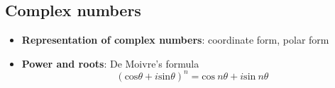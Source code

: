 \subsection{Complex numbers}
\begin{itemize}
\item \textbf{Representation of complex numbers}: coordinate form, polar form
\item \textbf{Power and roots}: De Moivre's formula
$$
(\mathrm{cos} \theta + i\mathrm{sin}\theta)^n = \mathrm{cos}\ n\theta + i\mathrm{sin}\ n\theta
$$
\end{itemize}



